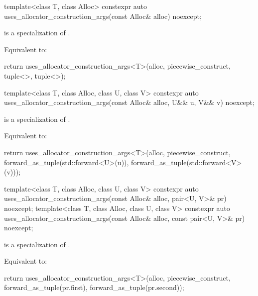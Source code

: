 %
\begin{itemdecl}
template<class T, class Alloc>
  constexpr auto uses_allocator_construction_args(const Alloc& alloc) noexcept;
\end{itemdecl}

\begin{itemdescr}
\pnum
\constraints
{} is a specialization of .

\pnum
\effects
Equivalent to:
\begin{codeblock}
return uses_allocator_construction_args<T>(alloc, piecewise_construct,
                                           tuple<>{}, tuple<>{});
\end{codeblock}
\end{itemdescr}

%
\begin{itemdecl}
template<class T, class Alloc, class U, class V>
  constexpr auto uses_allocator_construction_args(const Alloc& alloc,
                                                  U&& u, V&& v) noexcept;
\end{itemdecl}

\begin{itemdescr}
\pnum
\constraints
{} is a specialization of .

\pnum
\effects
Equivalent to:
\begin{codeblock}
return uses_allocator_construction_args<T>(alloc, piecewise_construct,
                                           forward_as_tuple(std::forward<U>(u)),
                                           forward_as_tuple(std::forward<V>(v)));
\end{codeblock}
\end{itemdescr}

%
\begin{itemdecl}
template<class T, class Alloc, class U, class V>
  constexpr auto uses_allocator_construction_args(const Alloc& alloc,
                                                  pair<U, V>& pr) noexcept;
template<class T, class Alloc, class U, class V>
  constexpr auto uses_allocator_construction_args(const Alloc& alloc,
                                                  const pair<U, V>& pr) noexcept;
\end{itemdecl}

\begin{itemdescr}
\pnum
\constraints
{} is a specialization of .

\pnum
\effects
Equivalent to:
\begin{codeblock}
return uses_allocator_construction_args<T>(alloc, piecewise_construct,
                                           forward_as_tuple(pr.first),
                                           forward_as_tuple(pr.second));
\end{codeblock}
\end{itemdescr}


